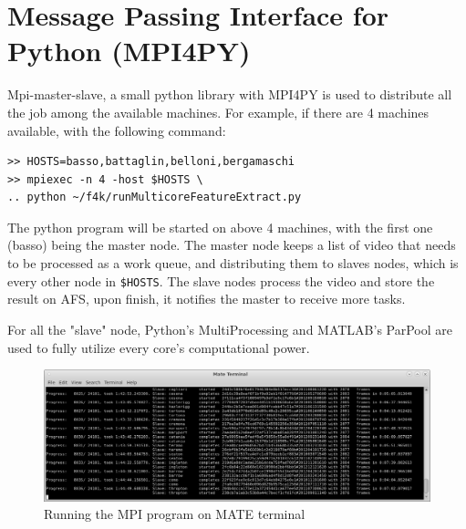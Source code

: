 \documentclass[bsc,logo,twoside,fullspacing,parskip]{infthesis}
\begin{document}
\section{Message Passing Interface for Python (MPI4PY)}

Mpi-master-slave, a small python library with MPI4PY is used to distribute all the job among the available machines. 
For example, if there are 4 machines available, with the following command: 
\lstset{basicstyle=\footnotesize\ttfamily,breaklines=true}
\begin{lstlisting}[frame=single]
>> HOSTS=basso,battaglin,belloni,bergamaschi
>> mpiexec -n 4 -host $HOSTS \
.. python ~/f4k/runMulticoreFeatureExtract.py
\end{lstlisting}
The python program will be started on above 4 machines, with the first one (basso) being the master node.
The master node keeps a list of video that needs to be processed as a work queue, and distributing them to slaves nodes, which is every other node in {\tt \$HOSTS}. 
The slave nodes process the video and store the result on AFS, upon finish, it notifies the master to receive more tasks.


For all the "slave" node, Python's MultiProcessing and MATLAB's ParPool are used to fully utilize every core's computational power.

\begin{figure}
    \centering
    \includegraphics[scale=0.30]{graph/sample_terminal.png}
    \caption{Running the MPI program on MATE terminal}
    \label{fig:mpi}
\end{figure}
\end{document}
